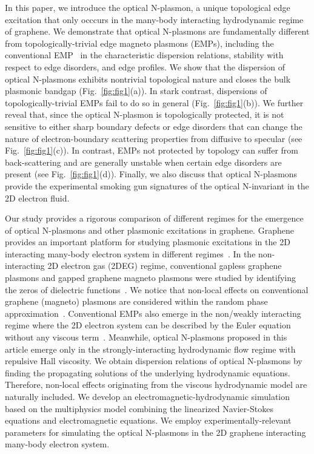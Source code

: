 \documentclass[%
reprint,
amsmath,amssymb,
aps,superscriptaddress
]{revtex4-2}
\begin{document}
In this paper, we introduce the optical N-plasmon, a unique topological edge excitation that only occcurs in the many-body interacting hydrodynamic regime of graphene. We demonstrate that optical N-plasmons are fundamentally different from topologically-trivial edge magneto plasmons (EMPs), including the conventional EMP~\cite{fetter1985edge} in the characteristic dispersion relations, stability with respect to edge disorders, and edge profiles. We show that the dispersion of optical N-plasmons exhibits nontrivial topological nature and closes the bulk plasmonic bandgap (Fig.~\ref{fig:fig1}(a)). In stark contrast, dispersions of topologically-trivial EMPs fail to do so in general (Fig.~\ref{fig:fig1}(b)). We further reveal that, since the optical N-plasmon is topologically protected, it is not sensitive to either sharp boundary defects or edge disorders that can change the nature of electron-boundary scattering properties from diffusive to specular (see Fig.~\ref{fig:fig1}(c)). In contrast, EMPs not protected by topology can suffer from back-scattering and are generally unstable when certain edge disorders are present (see Fig.~\ref{fig:fig1}(d)). Finally, we also discuss that optical N-plasmons provide the experimental smoking gun signatures of the optical N-invariant in the 2D electron fluid. 

Our study provides a rigorous comparison of different regimes for the emergence of optical N-plasmons and other plasmonic excitations in graphene. Graphene provides an important platform for studying plasmonic excitations in the 2D interacting many-body electron system in different regimes~\cite{koppens2011graphene,jablan2009plasmonics,garcia2014graphene,chen2012optical,grigorenko2012graphene,zhao2023observation}. In the non-interacting 2D electron gas (2DEG) regime, conventional gapless graphene plasmons and gapped graphene magneto plasmons were studied by identifying the zeros of dielectric functions~\cite{jablan2013plasmons,hwang2007dielectric,yan2012infrared,berman2008magnetoplasmons}. We notice that non-local effects on conventional graphene (magneto) plasmons are considered within the random phase approximation~\cite{hwang2007dielectric}. Conventional EMPs also emerge in the non/weakly interacting regime where the 2D electron system can be described by the Euler equation without any viscous term~\cite{fetter1985edge}. Meanwhile, optical N-plasmons proposed in this article emerge only in the strongly-interacting hydrodynamic flow regime with repulsive Hall viscosity. We obtain dispersion relations of optical N-plasmons by finding the propagating solutions of the underlying hydrodynamic equations. Therefore, non-local effects originating from the viscous hydrodynamic model are naturally included.  We develop an electromagnetic-hydrodynamic simulation based on the multiphysics model combining the linearized Navier-Stokes equations and electromagnetic equations. We employ experimentally-relevant parameters for simulating the optical N-plasmons in the 2D graphene interacting many-body electron system. 
\end{document}

